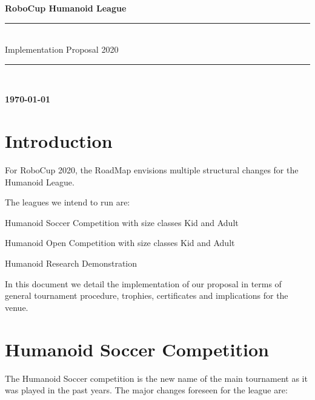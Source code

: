 \documentclass{article}
\begin{document}
\begin{center}
  {\Huge \bfseries
    RoboCup Humanoid League
    \\
    \rule{\textwidth}{0.1cm}\\
    \vspace{0.5cm}
    Implementation Proposal 2020\\
    \vspace{0.5cm}
    \rule{\textwidth}{0.1cm}\\
  }
  {\bfseries \today}
\end{center}

\newpage

\section{Introduction}

For RoboCup 2020, the RoadMap envisions multiple structural changes for the Humanoid League.

The leagues we intend to run are:

\begin{description}[leftmargin=5em,style=nextline]
\item[HSC:] Humanoid Soccer Competition with size classes Kid and Adult
\item[HOC:] Humanoid Open Competition with size classes Kid and Adult
\item[HRD:] Humanoid Research Demonstration
\end{description}

In this document we detail the implementation of our proposal in terms of general tournament procedure, trophies, certificates and implications for the venue.

\section{Humanoid Soccer Competition}
The Humanoid Soccer competition is the new name of the main tournament as it was played in the past years. The major changes foreseen for the league are:
\end{document}
